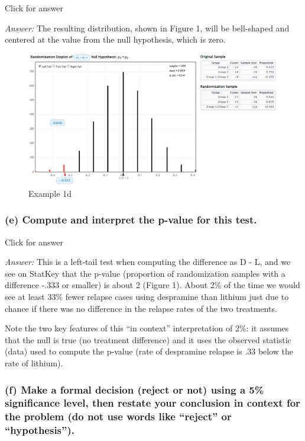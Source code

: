 \documentclass[
]{book}
\begin{document}
Click for answer

\emph{Answer:} The resulting distribution, shown in Figure 1, will be bell-shaped and centered at the value from the null hypothesis, which is zero.

\begin{figure}
\centering
\includegraphics{data/DLrand.png}
\caption{Example 1d}
\end{figure}

\hypertarget{e-compute-and-interpret-the-p-value-for-this-test.}{%
\subsubsection{(e) Compute and interpret the p-value for this test.}\label{e-compute-and-interpret-the-p-value-for-this-test.}}

Click for answer

\emph{Answer:} This is a left-tail test when computing the difference as D - L, and we see on StatKey that the p-value (proportion of randomization samples with a difference -.333 or smaller) is about 2 (Figure 1). About 2\% of the time we would see at least 33\% fewer relapse cases using despramine than lithium just due to chance if there was no difference in the relapse rates of the two treatments.

Note the two key features of this ``in context'' interpretation of 2\%: it assumes that the null is true (no treatment difference) and it uses the observed statistic (data) used to compute the p-value (rate of despramine relapse is .33 below the rate of lithium).

\hypertarget{f-make-a-formal-decision-reject-or-not-using-a-5-significance-level-then-restate-your-conclusion-in-context-for-the-problem-do-not-use-words-like-reject-or-hypothesis.}{%
\subsubsection{(f) Make a formal decision (reject or not) using a 5\% significance level, then restate your conclusion in context for the problem (do not use words like ``reject'' or ``hypothesis'').}\label{f-make-a-formal-decision-reject-or-not-using-a-5-significance-level-then-restate-your-conclusion-in-context-for-the-problem-do-not-use-words-like-reject-or-hypothesis.}}
\end{document}
